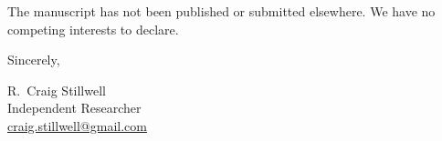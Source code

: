 \documentclass[11pt]{article}
\begin{document}
The manuscript has not been published or submitted elsewhere. We have no
competing interests to declare.

\bigskip

\noindent
Sincerely,

\bigskip
\bigskip

\noindent
R.\ Craig Stillwell\\
Independent Researcher\\
\href{mailto:craig.stillwell@gmail.com}{craig.stillwell@gmail.com}
\end{document}
